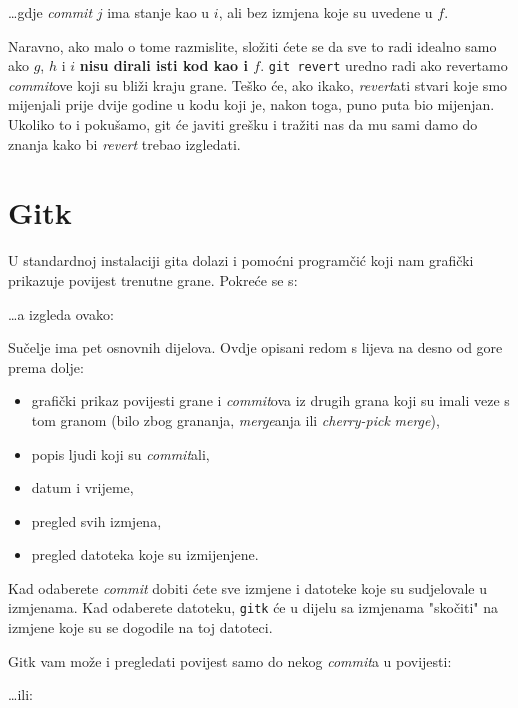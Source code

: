 \dots{}gdje \emph{commit} $j$ ima stanje kao u $i$, ali bez izmjena koje su uvedene u $f$.

Naravno, ako malo o tome razmislite, složiti ćete se da sve to radi idealno samo ako $g$, $h$ i $i$ \textbf{nisu dirali isti kod kao i $f$}.
\verb+git revert+ uredno radi ako revertamo \emph{commit}ove koji su bliži kraju grane.
Teško će, ako ikako, \emph{revert}ati stvari koje smo mijenjali prije dvije godine u kodu koji je, nakon toga, puno puta bio mijenjan.
Ukoliko to i pokušamo, git će javiti grešku i tražiti nas da mu sami damo do znanja kako bi \emph{revert} trebao izgledati.

\section*{Gitk}

U standardnoj instalaciji gita dolazi i pomoćni programčić koji nam grafički prikazuje povijest trenutne grane.
Pokreće se s:


\dots{}a izgleda ovako:


Sučelje ima pet osnovnih dijelova.
Ovdje opisani redom s lijeva na desno od gore prema dolje:

\begin{itemize}
	\item grafički prikaz povijesti grane i \emph{commit}ova iz drugih grana koji su imali veze s tom granom (bilo zbog grananja, \emph{merge}anja ili \emph{cherry-pick} \emph{merge}),
	\item popis ljudi koji su \emph{commit}ali,
	\item datum i vrijeme, 
	\item pregled svih izmjena,
	\item pregled datoteka koje su izmijenjene.
\end{itemize}

Kad odaberete \emph{commit} dobiti ćete sve izmjene i datoteke koje su sudjelovale u izmjenama.
Kad odaberete datoteku, \verb+gitk+ će u dijelu sa izmjenama "skočiti" na izmjene koje su se dogodile na toj datoteci.

Gitk vam može i pregledati povijest samo do nekog \emph{commit}a u povijesti:


\dots{}ili:

